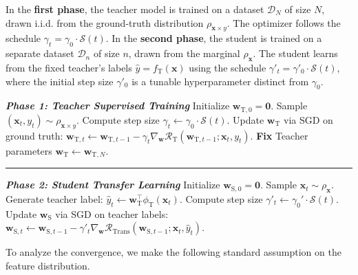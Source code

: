 \documentclass{article}
\theoremstyle{definition}
\theoremstyle{definition}
\theoremstyle{plain}
\theoremstyle{plain}
\theoremstyle{plain}
\theoremstyle{plain}
\theoremstyle{plain}
\newcommand{\te}{\mathrm{T}}
\begin{document}
In the \textbf{first phase}, the teacher model is trained on a dataset $\mathcal{D}_N$ of size $N$, drawn i.i.d. from the ground-truth distribution $\rho_{\mathbf{x}\times y}$. The optimizer follows the schedule $\gamma_t = \gamma_0 \cdot \mathcal{S}(t)$. In the \textbf{second phase}, the student is trained on a separate dataset $\mathcal{D}_n$ of size $n$, drawn from the marginal $\rho_{\mathbf{x}}$. The student learns from the fixed teacher's labels $\hat{y} = f_{\mathrm{T}}(\mathbf{x})$ using the schedule $\gamma'_t = \gamma'_0 \cdot \mathcal{S}(t)$, where the initial step size $\gamma'_0$ is a tunable hyperparameter distinct from $\gamma_0$.


\begin{algorithm}[t]
   \caption{Two-Phase SGD for Knowledge Transfer}
   \label{alg:kd_training}
\begin{algorithmic}

   \STATE \textit{\textbf{Phase 1: Teacher Supervised Training}}
   \STATE Initialize $\mathbf{w}_{\mathrm{T}, 0} = \mathbf{0}$.
       \STATE Sample $(\mathbf{x}_t, y_t) \sim \rho_{\mathbf{x}\times y}$.
       \STATE Compute step size $\gamma_t \leftarrow \gamma_0 \cdot \mathcal{S}(t)$.
       \STATE Update $\mathbf{w}_{\mathrm{T}}$ via SGD on ground truth:
       \STATE \quad $\mathbf{w}_{\mathrm{T}, t} \leftarrow \mathbf{w}_{\mathrm{T}, t-1} - \gamma_t \nabla_{\mathbf{w}} \mathcal{R}_\te(\mathbf{w}_{\mathrm{T}, t-1}; \mathbf{x}_t, y_t)$.
   \ENDFOR
   \STATE \textbf{Fix} Teacher parameters $\mathbf{w}_{\mathrm{T}} \leftarrow \mathbf{w}_{\mathrm{T}, N}$.

   \vspace{0.1cm}
   \hrule
   \vspace{0.1cm}
   \STATE \textit{\textbf{Phase 2: Student Transfer Learning}}
   \STATE Initialize $\mathbf{w}_{\mathrm{S}, 0} = \mathbf{0}$.
       \STATE Sample $\mathbf{x}_t \sim \rho_{\mathbf{x}}$.
       \STATE Generate teacher label: $\hat{y}_t \leftarrow \mathbf{w}_{\mathrm{T}}^\top \phi_{\mathrm{T}}(\mathbf{x}_t)$.
       \STATE Compute step size $\gamma'_t \leftarrow \gamma_0' \cdot \mathcal{S}(t)$.
       \STATE Update $\mathbf{w}_{\mathrm{S}}$ via SGD on teacher labels:
       \STATE \quad $\mathbf{w}_{\mathrm{S}, t} \leftarrow \mathbf{w}_{\mathrm{S}, t-1} - \gamma'_t \nabla_{\mathbf{w}} \mathcal{R}_\text{Trans}(\mathbf{w}_{\mathrm{S}, t-1}; \mathbf{x}_t, \hat{y}_t)$.
   \ENDFOR
\end{algorithmic}
\end{algorithm}
To analyze the convergence, we make the following standard assumption on the feature distribution.
\end{document}
